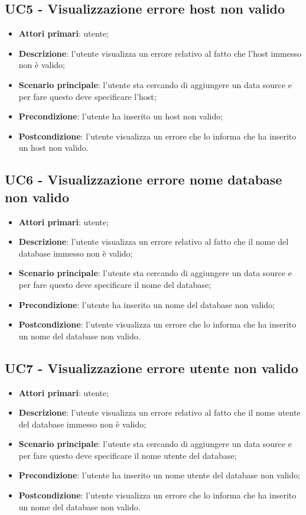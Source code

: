 \subsection{UC5 - Visualizzazione errore host non valido}
\begin{itemize}
	\item \textbf{Attori primari}: utente;
	\item \textbf{Descrizione}: l'utente visualizza un errore relativo al fatto che l'host immesso non è valido;
	\item \textbf{Scenario principale}: l'utente sta cercando di aggiungere un data source e per fare questo deve specificare l'host;
	\item \textbf{Precondizione}: l'utente ha inserito un host non valido;
	\item \textbf{Postcondizione}: l'utente visualizza un errore che lo informa che ha inserito un host non valido.
\end{itemize}

\subsection{UC6 - Visualizzazione errore nome database non valido}
\begin{itemize}
	\item \textbf{Attori primari}: utente;
	\item \textbf{Descrizione}: l'utente visualizza un errore relativo al fatto che il nome del database immesso non è valido;
	\item \textbf{Scenario principale}: l'utente sta cercando di aggiungere un data source e per fare questo deve specificare il nome del database;
	\item \textbf{Precondizione}: l'utente ha inserito un nome del database non valido;
	\item \textbf{Postcondizione}: l'utente visualizza un errore che lo informa che ha inserito un nome del database non valido.
\end{itemize}

\subsection{UC7 - Visualizzazione errore utente non valido}
\begin{itemize}
	\item \textbf{Attori primari}: utente;
	\item \textbf{Descrizione}: l'utente visualizza un errore relativo al fatto che il nome utente del database immesso non è valido;
	\item \textbf{Scenario principale}: l'utente sta cercando di aggiungere un data source e per fare questo deve specificare il nome utente del database;
	\item \textbf{Precondizione}: l'utente ha inserito un nome utente del database non valido;
	\item \textbf{Postcondizione}: l'utente visualizza un errore che lo informa che ha inserito un nome del database non valido.
\end{itemize}

